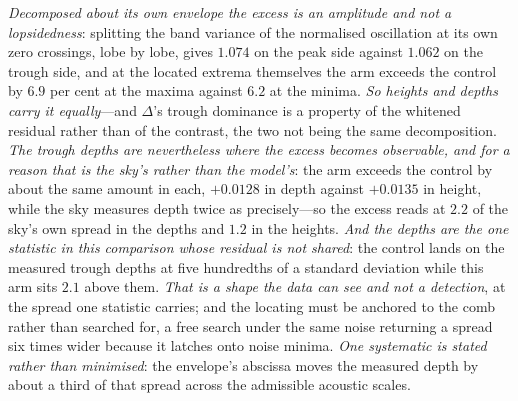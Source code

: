 \documentclass[11pt,a4paper]{article}
\theoremstyle{plain}
\theoremstyle{definition}
\theoremstyle{remark}
\begin{document}
\emph{Decomposed about its own envelope the excess is an amplitude and not a lopsidedness}: splitting the band
variance of the normalised oscillation at its own zero crossings, lobe by lobe, gives $1.074$ on the peak side against $1.062$ on the
trough side, and at the located extrema themselves the arm exceeds the control by $6.9$ per cent at the maxima
against $6.2$ at the minima. \emph{So heights and depths carry it equally}---and $\Delta$'s trough dominance is
a property of the whitened residual rather than of the contrast, the two not being the same decomposition.
\emph{The trough depths are nevertheless where the excess becomes observable, and for a reason that is the
sky's rather than the model's}: the arm exceeds the control by about the same amount in each, $+0.0128$ in depth
against $+0.0135$ in height, while the sky measures depth twice as precisely---so the excess reads at
$2.2$ of the sky's own spread in the depths and $1.2$ in the heights. \emph{And the depths are the one
statistic in this comparison whose residual is not shared}: the control lands on the measured trough depths at
five hundredths of a standard deviation while this arm sits $2.1$ above
them.
\emph{That is a shape the data can see and not a detection}, at the spread one statistic carries; and the
locating must be anchored to the comb rather than searched for, a free search under the same noise returning a
spread six times wider because it latches onto noise minima. \emph{One systematic is stated rather than
minimised}: the envelope's abscissa moves the measured depth by about a third of that spread across the
admissible acoustic scales.
\end{document}
